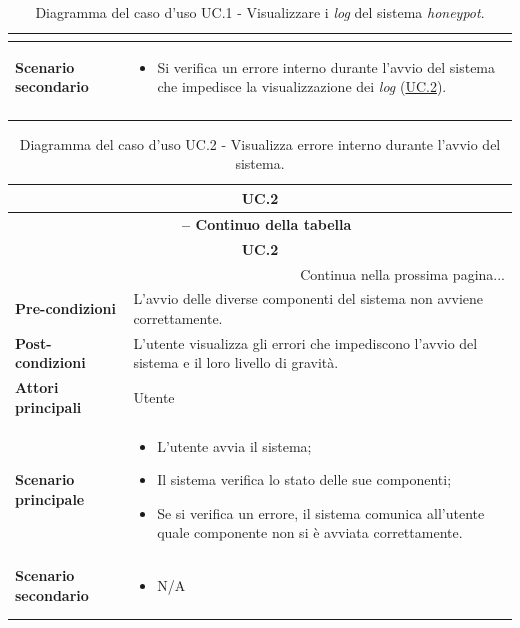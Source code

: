 \begin{center}
\begin{longtable}{|p{}|p{}|}
\begin{itemize}
\end{itemize} \\ \hline
\textbf{Scenario secondario} & 
\begin{itemize}
    \item Si verifica un errore interno durante l'avvio del sistema che impedisce la visualizzazione dei \textit{log} (\hyperref[tab:uc-2]{UC.2}).
\end{itemize} \\ \hline
\caption{Diagramma del caso d'uso UC.1 - Visualizzare i \textit{log} del sistema \textit{honeypot}.}
\label{tab:uc-1}
\end{longtable}
\end{center}

\begin{center}
\begin{longtable}{|p{}|p{}|}
\hline
\multicolumn{2}{|c|}{\textbf{UC.2}}\\ 
\hline 
\endfirsthead
\multicolumn{2}{c}{{\bfseries \tablename\ \thetable{} -- Continuo della tabella}}\\
\hline
\multicolumn{2}{|c|}{\textbf{UC.2}}\\ \hline 
\endhead
\hline
\multicolumn{2}{|r|}{{Continua nella prossima pagina...}}\\
\hline
\endfoot
\endlastfoot
\textbf{Pre-condizioni} & L'avvio delle diverse componenti del sistema non avviene correttamente. \\ \hline
\textbf{Post-condizioni} & L'utente visualizza gli errori che impediscono l'avvio del sistema e il loro livello di gravità. \\ \hline
\textbf{Attori principali} & Utente \\ \hline
\textbf{Scenario principale} & 
\begin{itemize}
    \item L'utente avvia il sistema;
    \item Il sistema verifica lo stato delle sue componenti;
    \item Se si verifica un errore, il sistema comunica all'utente quale componente non si è avviata correttamente.
\end{itemize} \\ \hline
\textbf{Scenario secondario} & 
\begin{itemize}
    \item N/A 
\end{itemize} \\ \hline
\caption{Diagramma del caso d'uso UC.2 - Visualizza errore interno durante l'avvio del sistema.}
\label{tab:uc-2}
\end{longtable}
\end{center}

